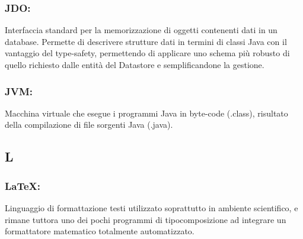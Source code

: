 \subsubsection*{JDO:}
Interfaccia standard per la memorizzazione di oggetti contenenti dati in un
database. Permette di descrivere strutture dati in termini di classi Java con il
vantaggio del type-safety, permettendo di applicare uno schema pi\`u
robusto di quello richiesto dalle entit\`a del Datastore e semplificandone la
gestione.

\subsubsection*{JVM:} Macchina virtuale che esegue i programmi Java in byte-code
(.class), risultato della compilazione di file sorgenti Java (.java).


\subsection*{\huge{L}}
\subsubsection*{LaTeX:} Linguaggio di formattazione testi utilizzato
soprattutto in ambiente scientifico, e rimane tuttora uno dei pochi programmi
di tipocomposizione ad integrare un formattatore matematico totalmente automatizzato.

